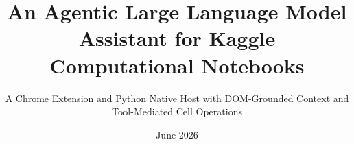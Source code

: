 \documentclass[11pt,a4paper,oneside]{book} %
\title{An Agentic Large Language Model Assistant for Kaggle Computational Notebooks}
\subtitle{A Chrome Extension and Python Native Host with DOM-Grounded Context and Tool-Mediated Cell Operations}
\date{June 2026}
\numberwithin{equation}{section}
\begin{document}
\maketitle









\tableofcontents
\listoftables
\listoffigures


\resetpagenumbering










\printbibliography
\end{document}
